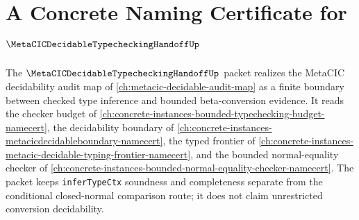 \chapter{A Concrete Naming Certificate for $\MetaCICDecidableTypecheckingHandoffUp$}
\label{ch:concrete-instances-metacic-decidable-typechecking-handoff-namecert}

The $\MetaCICDecidableTypecheckingHandoffUp$ packet realizes the MetaCIC decidability audit map of \autoref{ch:metacic-decidable-audit-map} as a finite boundary between checked type inference and bounded beta-conversion evidence. It reads the checker budget of \autoref{ch:concrete-instances-bounded-typechecking-budget-namecert}, the decidability boundary of \autoref{ch:concrete-instances-metacicdecidableboundary-namecert}, the typed frontier of \autoref{ch:concrete-instances-metacic-decidable-typing-frontier-namecert}, and the bounded normal-equality checker of \autoref{ch:concrete-instances-bounded-normal-equality-checker-namecert}. The packet keeps \texttt{inferTypeCtx} soundness and completeness separate from the conditional closed-normal comparison route; it does not claim unrestricted conversion decidability.

